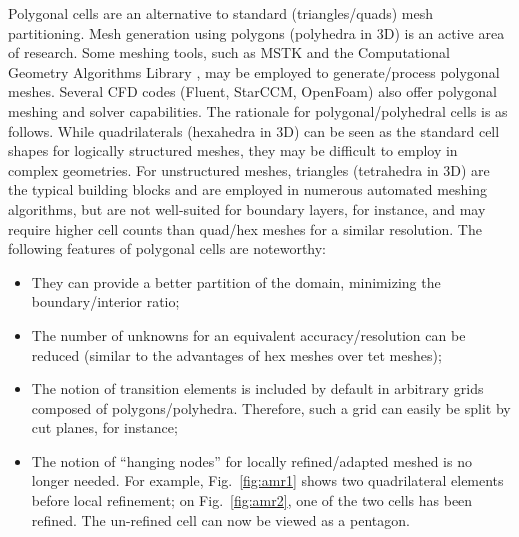 \documentclass[preprint,10pt]{elsarticle}
\newcommand{\fig}[1]{Fig.~\ref{#1}}                      %
\begin{document}
Polygonal cells are an alternative to standard (triangles/quads) mesh partitioning.
Mesh generation using polygons (polyhedra in 3D) is an active area of research.
Some meshing tools, such as MSTK \cite{garimella-2004-mstk} and the Computational Geometry Algorithms 
Library \cite{cgal,cgal:gw-p2-12b}, may be employed to generate/process polygonal meshes.  
Several CFD codes (Fluent, StarCCM, OpenFoam) also offer polygonal meshing and solver capabilities. 
%
The rationale for polygonal/polyhedral cells is as follows.
While quadrilaterals (hexahedra in 3D) can be seen as the standard cell shapes for logically 
structured meshes, they may be difficult to employ in complex geometries. For unstructured meshes,
triangles (tetrahedra in 3D) are the typical building blocks and are employed in 
numerous automated meshing algorithms, but are not well-suited for boundary layers, 
for instance, and may require higher cell counts than quad/hex meshes for a similar
resolution.  The following features of polygonal cells are noteworthy:
\begin{itemize}
  \item They can provide a better partition of the domain, minimizing the boundary/interior ratio;
  \item The number of unknowns for an equivalent accuracy/resolution can be reduced (similar to the advantages of 
	hex meshes over tet meshes);
	\item The notion of transition elements is included by default in arbitrary grids composed of
	polygons/polyhedra. Therefore, such a grid can easily be split by cut planes, for 
	instance;
  \item The notion of ``hanging nodes'' for locally refined/adapted meshed is no longer needed.
	For example, \fig{fig:amr1} shows two quadrilateral elements before local refinement; on
	\fig{fig:amr2}, one of the two cells has been refined. The un-refined cell can now be viewed as a
	pentagon.
\end{itemize}
\end{document}
